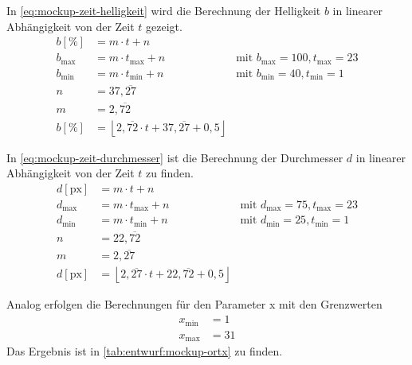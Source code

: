 In \autoref{eq:mockup-zeit-helligkeit} wird die Berechnung der Helligkeit $b$ in linearer Abhängigkeit von der Zeit $t$ gezeigt.
\begin{equation}
\begin{aligned}\label{eq:mockup-zeit-helligkeit}
	b [\%] &= m \cdot t + n\\
	b_{\text{max}} &= m \cdot t_{\text{max}} + n &\text{mit } b_{\text{max}} = 100, t_{\text{max}} = 23\\
	b_{\text{min}} &= m \cdot t_{\text{min}} + n &\text{mit } b_{\text{min}} = 40, t_{\text{min}} = 1\\
	n &= 37,\overline{27}\\
	m &= 2,\overline{72}\\
	b [\%] &= \boxed{\left\lfloor 2,\overline{72} \cdot t + 37,\overline{27} + 0,5 \right\rfloor}
\end{aligned}
\end{equation}

In \autoref{eq:mockup-zeit-durchmesser} ist die Berechnung der Durchmesser $d$ in linearer Abhängigkeit von der Zeit $t$ zu finden.
\begin{equation}
\begin{aligned}\label{eq:mockup-zeit-durchmesser}
	d [\text{px}] &= m \cdot t + n\\
	d_{\text{max}} &= m \cdot t_{\text{max}} + n &\text{mit } d_{\text{max}} = 75, t_{\text{max}} = 23\\
	d_{\text{min}} &= m \cdot t_{\text{min}} + n &\text{mit } d_{\text{min}} = 25, t_{\text{min}} = 1\\
	n &= 22,\overline{72}\\
	m &= 2,\overline{27}\\
	d [\text{px}] &= \boxed{\left\lfloor 2,\overline{27} \cdot t + 22,\overline{72} + 0,5 \right\rfloor}
\end{aligned}
\end{equation}

Analog erfolgen die Berechnungen für den Parameter  x mit den Grenzwerten
\begin{equation}
\begin{aligned}\label{eq:mockup-ortx-grenzwerte}
	x_{\text{min}} &= 1\\
	x_{\text{max}} &= 31
\end{aligned}
\end{equation}
Das Ergebnis ist in \autoref{tab:entwurf:mockup-ortx} zu finden.

